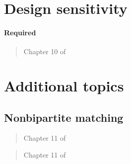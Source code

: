 \documentclass[12pt]{article}
\begin{document}
\section{Design sensitivity}

\paragraph*{Required}

\begin{verse}  \end{verse}

\begin{verse} Chapter 10 of  \end{verse}

\section{Additional topics}

\subsection{Nonbipartite matching}\label{sec:nbp}

\begin{verse} Chapter 11 of  \end{verse}

\begin{verse}  \end{verse}

\begin{verse} Chapter 11 of  \end{verse}

\begin{verse}  \end{verse}

\begin{verse}  \end{verse}

\begin{verse}  \end{verse}

\begin{verse}  \end{verse}
\begin{verse}  \end{verse}
\end{document}
